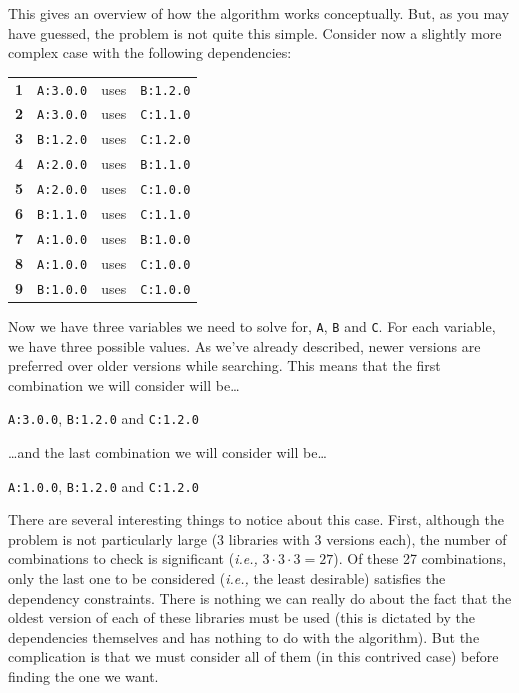 \documentclass[11pt,a4paper,twocolumn]{article}
\renewcommand{\small}{\fontsize{9.5pt}{11.1pt}\selectfont}
\newcommand{\code}[1]{\texttt{#1}} %
\begin{document}
This gives an overview of how the algorithm works conceptually.  But,
as you may have guessed, the problem is not quite this simple.
Consider now a slightly more complex case with the following
dependencies:
{\small
\begin{center}
\begin{tabular}{llcl}
  \textbf{1} &\code{A:3.0.0} &uses &\code{B:1.2.0} \\
  \textbf{2} &\code{A:3.0.0} &uses &\code{C:1.1.0}\\
  \textbf{3} &\code{B:1.2.0} &uses &\code{C:1.2.0}\\
  \textbf{4} &\code{A:2.0.0} &uses &\code{B:1.1.0}\\
  \textbf{5} &\code{A:2.0.0} &uses &\code{C:1.0.0}\\
  \textbf{6} &\code{B:1.1.0} &uses &\code{C:1.1.0}\\
  \textbf{7} &\code{A:1.0.0} &uses &\code{B:1.0.0}\\
  \textbf{8} &\code{A:1.0.0} &uses &\code{C:1.0.0}\\
  \textbf{9} &\code{B:1.0.0} &uses &\code{C:1.0.0}
\end{tabular}
\end{center}
} Now we have three variables we need to solve for, \code{A}, \code{B}
and \code{C}.  For each variable, we have three possible values.  As
we've already described, newer versions are preferred over older
versions while searching.  This means that the first combination we
will consider will be\ldots

\code{A:3.0.0}, \code{B:1.2.0} and \code{C:1.2.0}

\noindent
\ldots and the last combination we will consider will be\ldots

\code{A:1.0.0}, \code{B:1.2.0} and \code{C:1.2.0}

There are several interesting things to notice about this case.
First, although the problem is not particularly large (3 libraries
with 3 versions each), the number of combinations to check is
significant (\emph{i.e.,} $3\cdot 3\cdot 3 = 27$).  Of these 27 combinations, only
the last one to be considered (\emph{i.e.,} the least desirable)
satisfies the dependency constraints.  There is nothing we can really
do about the fact that the oldest version of each of these libraries
must be used (this is dictated by the dependencies themselves and has
nothing to do with the algorithm).  But the complication is that we
must consider all of them (in this contrived case) before finding the
one we want.
\end{document}
